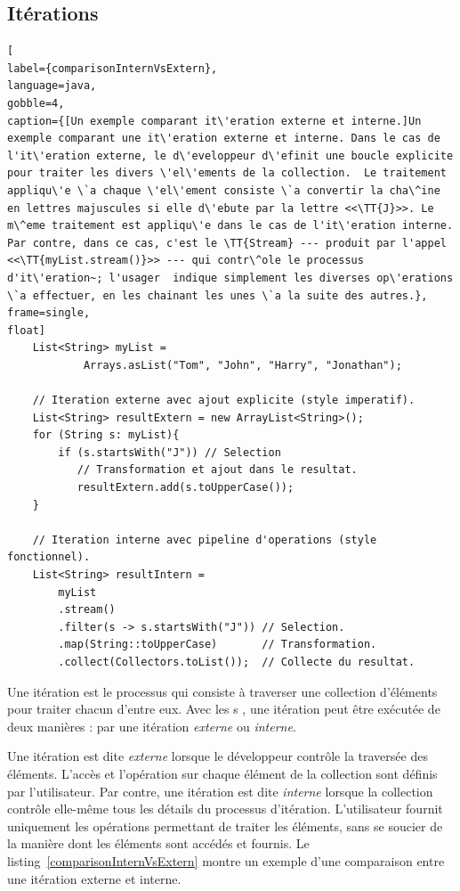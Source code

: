 \subsection{It\'erations}


\begin{lstlisting}[
label={comparisonInternVsExtern},
language=java,
gobble=4,
caption={[Un exemple comparant it\'eration externe et interne.]Un exemple comparant une it\'eration externe et interne. Dans le cas de l'it\'eration externe, le d\'eveloppeur d\'efinit une boucle explicite pour traiter les divers \'el\'ements de la collection.  Le traitement appliqu\'e \`a chaque \'el\'ement consiste \`a convertir la cha\^ine en lettres majuscules si elle d\'ebute par la lettre <<\TT{J}>>. Le m\^eme traitement est appliqu\'e dans le cas de l'it\'eration interne. Par contre, dans ce cas, c'est le \TT{Stream} --- produit par l'appel <<\TT{myList.stream()}>> --- qui contr\^ole le processus d'it\'eration~; l'usager  indique simplement les diverses op\'erations \`a effectuer, en les chainant les unes \`a la suite des autres.},
frame=single,
float]
    List<String> myList =
            Arrays.asList("Tom", "John", "Harry", "Jonathan");

    // Iteration externe avec ajout explicite (style imperatif).
    List<String> resultExtern = new ArrayList<String>();
    for (String s: myList){
        if (s.startsWith("J")) // Selection
           // Transformation et ajout dans le resultat.
           resultExtern.add(s.toUpperCase()); 
    }
        
    // Iteration interne avec pipeline d'operations (style fonctionnel).
    List<String> resultIntern = 
        myList
        .stream()
        .filter(s -> s.startsWith("J")) // Selection.
        .map(String::toUpperCase)       // Transformation.
        .collect(Collectors.toList());  // Collecte du resultat.
\end{lstlisting}


Une it\'eration est le processus qui consiste \`a traverser une collection d'\'el\'ements pour traiter chacun d'entre eux. Avec les s , une it\'eration peut \^etre ex\'ecut\'ee de deux mani\`eres : par une it\'eration \emph{externe} ou \emph{interne}. 

Une it\'eration est dite \emph{externe} lorsque le d\'eveloppeur contr\^ole la travers\'ee des \'el\'ements.  L'acc\`es et l'op\'eration sur chaque \'el\'ement de la collection sont d\'efinis par l'utilisateur. Par contre, une it\'eration est dite \emph{interne} lorsque la collection contr\^ole elle-m\^eme tous les d\'etails du processus d'it\'eration. L'utilisateur fournit uniquement les op\'erations permettant de traiter les \'el\'ements, sans se soucier de la mani\`ere dont les \'el\'ements sont acc\'ed\'es et fournis. Le listing~\ref{comparisonInternVsExtern} montre un exemple d’une comparaison entre une itération externe et interne. 


